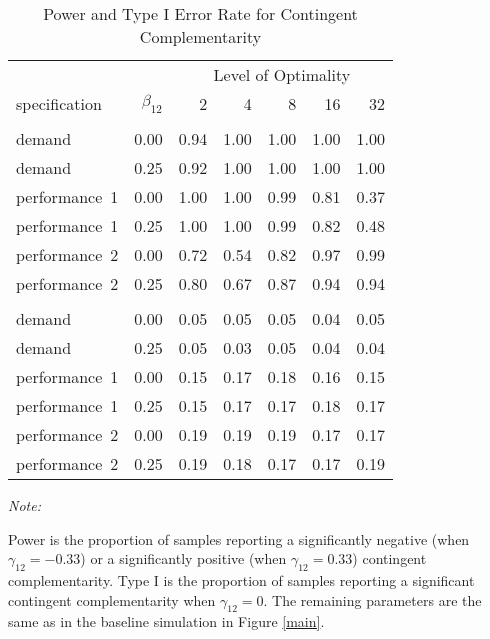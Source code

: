 \begin{table}

\caption{\label{tab:contingent-complementarity-table}Power and Type I Error Rate for Contingent
                   Complementarity}
\centering
\fontsize{9}{11}\selectfont
\begin{threeparttable}
\begin{tabular}[t]{lrrrrrr}
\toprule
\multicolumn{2}{c}{ } & \multicolumn{5}{c}{Level of Optimality} \\
\cmidrule(l{3pt}r{3pt}){3-7}
specification & $\beta_{12}$ & 2 & 4 & 8 & 16 & 32\\
\midrule
\addlinespace[0.3em]
\multicolumn{7}{c}{\textbf{Power}}\\
\hspace{1em}demand & 0.00 & 0.94 & 1.00 & 1.00 & 1.00 & 1.00\\
\hspace{1em}demand & 0.25 & 0.92 & 1.00 & 1.00 & 1.00 & 1.00\\
\hspace{1em}performance~1 & 0.00 & 1.00 & 1.00 & 0.99 & 0.81 & 0.37\\
\hspace{1em}performance~1 & 0.25 & 1.00 & 1.00 & 0.99 & 0.82 & 0.48\\
\hspace{1em}performance~2 & 0.00 & 0.72 & 0.54 & 0.82 & 0.97 & 0.99\\
\hspace{1em}performance~2 & 0.25 & 0.80 & 0.67 & 0.87 & 0.94 & 0.94\\
\addlinespace[0.3em]
\multicolumn{7}{c}{\textbf{Type I}}\\
\hspace{1em}demand & 0.00 & 0.05 & 0.05 & 0.05 & 0.04 & 0.05\\
\hspace{1em}demand & 0.25 & 0.05 & 0.03 & 0.05 & 0.04 & 0.04\\
\hspace{1em}performance~1 & 0.00 & 0.15 & 0.17 & 0.18 & 0.16 & 0.15\\
\hspace{1em}performance~1 & 0.25 & 0.15 & 0.17 & 0.17 & 0.18 & 0.17\\
\hspace{1em}performance~2 & 0.00 & 0.19 & 0.19 & 0.19 & 0.17 & 0.17\\
\hspace{1em}performance~2 & 0.25 & 0.19 & 0.18 & 0.17 & 0.17 & 0.19\\
\bottomrule
\end{tabular}
\begin{tablenotes}
\item \textit{Note: } 
\item Power is the proportion of samples reporting a significantly negative (when $\gamma_{12} = -0.33$) or a significantly positive (when $\gamma_{12} = 0.33$) contingent complementarity. Type I is the proportion of samples reporting a significant contingent complementarity when $\gamma_{12} = 0$. The remaining parameters are the same as in the baseline simulation in Figure \ref{main}.
\end{tablenotes}
\end{threeparttable}
\end{table}